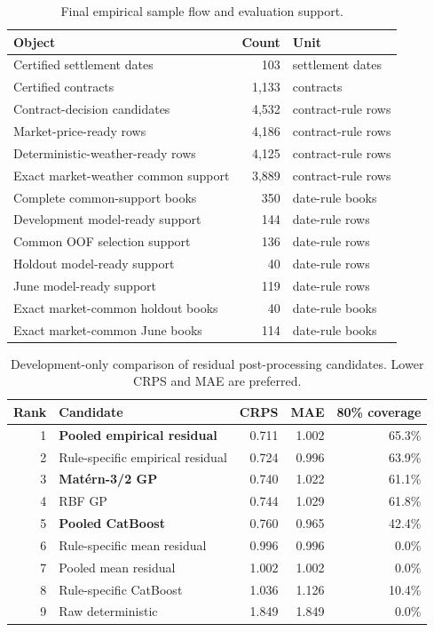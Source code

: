 \begin{table}[htbp]
\centering
\caption{Final empirical sample flow and evaluation support.}
\label{tab:final_sample_flow}
\begin{tabular}{lrl}
\toprule
Object & Count & Unit \\
\midrule
Certified settlement dates & 103 & settlement dates \\
Certified contracts & 1,133 & contracts \\
Contract-decision candidates & 4,532 & contract-rule rows \\
Market-price-ready rows & 4,186 & contract-rule rows \\
Deterministic-weather-ready rows & 4,125 & contract-rule rows \\
Exact market-weather common support & 3,889 & contract-rule rows \\
Complete common-support books & 350 & date-rule books \\
Development model-ready support & 144 & date-rule rows \\
Common OOF selection support & 136 & date-rule rows \\
Holdout model-ready support & 40 & date-rule rows \\
June model-ready support & 119 & date-rule rows \\
Exact market-common holdout books & 40 & date-rule books \\
Exact market-common June books & 114 & date-rule books \\
\bottomrule
\end{tabular}
\end{table}

\begin{table}[htbp]
\centering
\caption{Development-only comparison of residual post-processing candidates. Lower CRPS and MAE are preferred.}
\label{tab:development_model_selection}
\begin{tabular}{rlrrr}
\toprule
Rank & Candidate & CRPS & MAE & 80\% coverage \\
\midrule
1 & \textbf{Pooled empirical residual} & 0.711 & 1.002 & 65.3\% \\
2 & Rule-specific empirical residual & 0.724 & 0.996 & 63.9\% \\
3 & \textbf{Matérn-3/2 GP} & 0.740 & 1.022 & 61.1\% \\
4 & RBF GP & 0.744 & 1.029 & 61.8\% \\
5 & \textbf{Pooled CatBoost} & 0.760 & 0.965 & 42.4\% \\
6 & Rule-specific mean residual & 0.996 & 0.996 & 0.0\% \\
7 & Pooled mean residual & 1.002 & 1.002 & 0.0\% \\
8 & Rule-specific CatBoost & 1.036 & 1.126 & 10.4\% \\
9 & Raw deterministic & 1.849 & 1.849 & 0.0\% \\
\bottomrule
\end{tabular}
\end{table}

